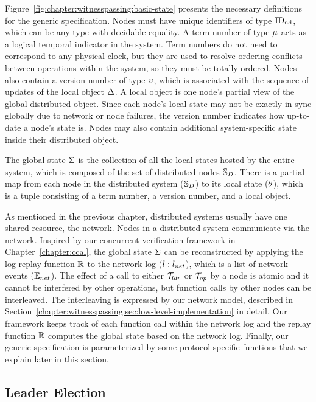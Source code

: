 Figure~\ref{fig:chapter:witnesspassing:basic-state} presents the necessary definitions for the
generic specification.
Nodes must have unique identifiers of type $\mathrm{ID_{nd}}$, which can be any type with decidable equality.
A term number of type $\mu$ acts as a logical temporal indicator in the system.
Term numbers do not need to correspond to any physical clock,
but they are used to resolve ordering conflicts between operations within the system,
so they must be totally ordered.
Nodes also contain a version number of type $\upsilon$, which is associated with the sequence of updates
of the local object $\Delta$.
A local object is one node's partial view of the global distributed object.
Since each node's local state may not be exactly in sync globally due to network or
node failures, the version number indicates how up-to-date a node's state is.
Nodes may also contain additional system-specific state inside their distributed object.

The global state $\Sigma$ is the collection of all the local states hosted by the
entire system, which is composed of the set of distributed nodes $\mathbb{S}_{D}$.
There is a partial map from each node in the distributed system ($\mathbb{S}_{D}$)
to its local state ($\theta$), which is a tuple consisting of a term number,
a version number, and a local object.

As mentioned in the previous chapter, 
distributed systems usually have one shared resource, the network. 
Nodes in a distributed system communicate via the network. 
Inspired by our concurrent verification framework in Chapter~\ref{chapter:ccal},
the global state $\Sigma$ can be reconstructed by
applying the log replay function $\mathbb{R}$ to the
network log ($l : {l_{net}}$), which is a list of network events (${\mathbb{E}_{net}}$).
The effect of a call to either $\mathcal{T}_{ldr}$ or $\mathcal{T}_{op}$ by a node is atomic 
and it cannot be interfered by other operations, 
but function calls by other nodes can be interleaved.
The interleaving is expressed by our network model, described in Section~\ref{chapter:witnesspassing:sec:low-level-implementation} in detail.
Our framework keeps track of each function call
within the network log and the replay function $\mathbb{R}$ computes the
global state based on the network log.
Finally, our generic specification is parameterized by some protocol-specific
functions that we explain later in this section.


\subsection{Leader Election}
\label{chapter:witnesspassing:subsec:leader-election}

